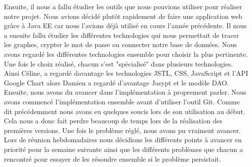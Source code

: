 Ensuite, il nous a fallu étudier les outils que nous pouvions utiliser pour réaliser notre projet. Nous avions décidé plutôt rapidement de faire une application web grâce à Java EE car nous l'avions déjà utilisé en cours l'année précédente. Il nous a ensuite fallu étudier les différentes technologies qui nous permettait de tracer les graphes, crypter le mot de passe ou connecter notre base de données. Nous avons regardé les différentes technologies ensemble pour choisir la plus pertinente. Une fois le choix réalisé, chacun s'est "spécialisé" dans plusieurs technologies. Ainsi Céline, a regardé davantage les technologies JSTL, CSS, JavaScript et l'API Google Chart alors Damien a regardé d'avantage Jasypt et le modèle DAO. \\

Ensuite, nous avons du avancer dans l'implémentation à proprement parler. Nous avons commencé l'implémentation ensemble avant d'utiliser l'outil Git. Comme dit précédemment nous avons eu quelques soucis lors de son utilisation au début. Cela nous a donc fait perdre beaucoup de temps lors de la réalisation des premières versions. Une fois le problème réglé, nous avons pu vraiment avancer. Lors de réunion hebdomadaires nous décidions les différents points à avancer en priorité pour la semaine suivante ainsi que les différents problèmes que chacun a rencontré pour essayer de les résoudre ensemble si le problème persistait. 
